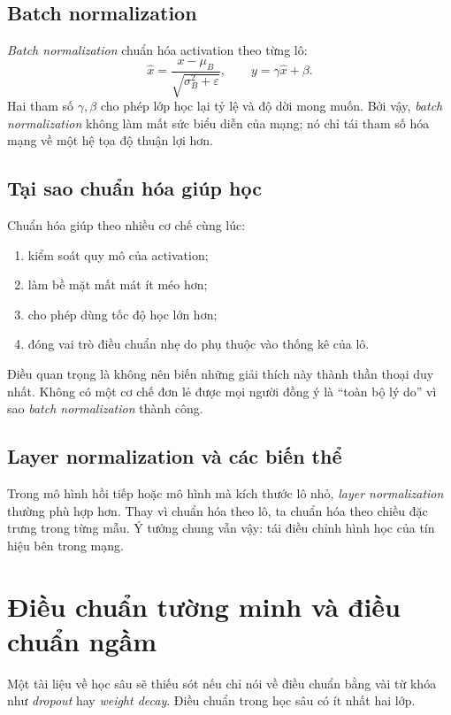 \subsection{Batch normalization}

\emph{Batch normalization} chuẩn hóa activation theo từng lô:
\[
\hat{x}=\frac{x-\mu_B}{\sqrt{\sigma_B^2+\varepsilon}},
\qquad
y=\gamma \hat{x}+\beta.
\]
Hai tham số \(\gamma,\beta\) cho phép lớp học lại tỷ lệ và độ dời mong muốn. Bởi vậy, \emph{batch normalization} không làm mất sức biểu diễn của mạng; nó chỉ tái tham số hóa mạng về một hệ tọa độ thuận lợi hơn.

\subsection{Tại sao chuẩn hóa giúp học}

Chuẩn hóa giúp theo nhiều cơ chế cùng lúc:

\begin{enumerate}
\item kiểm soát quy mô của activation;
\item làm bề mặt mất mát ít méo hơn;
\item cho phép dùng tốc độ học lớn hơn;
\item đóng vai trò điều chuẩn nhẹ do phụ thuộc vào thống kê của lô.
\end{enumerate}

Điều quan trọng là không nên biến những giải thích này thành thần thoại duy nhất. Không có một cơ chế đơn lẻ được mọi người đồng ý là ``toàn bộ lý do'' vì sao \emph{batch normalization} thành công.

\subsection{Layer normalization và các biến thể}

Trong mô hình hồi tiếp hoặc mô hình mà kích thước lô nhỏ, \emph{layer normalization} thường phù hợp hơn. Thay vì chuẩn hóa theo lô, ta chuẩn hóa theo chiều đặc trưng trong từng mẫu. Ý tưởng chung vẫn vậy: tái điều chỉnh hình học của tín hiệu bên trong mạng.

\section{Điều chuẩn tường minh và điều chuẩn ngầm}

Một tài liệu về học sâu sẽ thiếu sót nếu chỉ nói về điều chuẩn bằng vài từ khóa như \emph{dropout} hay \emph{weight decay}. Điều chuẩn trong học sâu có ít nhất hai lớp.

